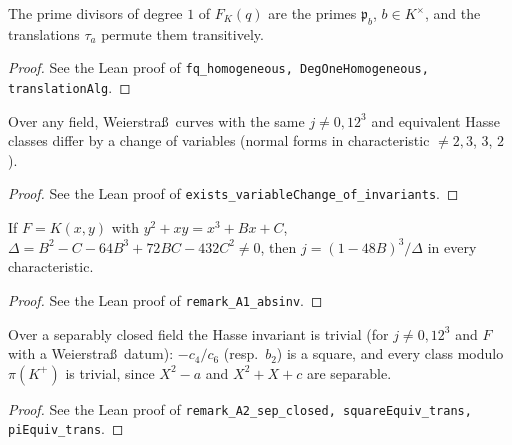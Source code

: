 \begin{lemma}
\label{lem:Fq-homogeneous}
\leanok
The prime divisors of degree $1$ of $F_K(q)$ are the primes $\mathfrak p_b$, $b\in K^\times$, and the translations $\tau_a$ permute them transitively.
\end{lemma}
\begin{proof}
\leanok
See the Lean proof of \texttt{fq\_homogeneous, DegOneHomogeneous, translationAlg}.
\end{proof}

\begin{lemma}
\label{lem:A1-classify}
\leanok
Over any field, Weierstra\ss\ curves with the same $j\neq0,12^3$ and equivalent Hasse classes differ by a change of variables (normal forms in characteristic $\ne2,3$, $3$, $2$).
\end{lemma}
\begin{proof}
\leanok
See the Lean proof of \texttt{exists\_variableChange\_of\_invariants}.
\end{proof}

\begin{remark}[Remark 1 (formula for $j$ from $y^2+xy=x^3+Bx+C$)]
\label{rem:A-1}
\leanok
If $F=K(x,y)$ with $y^2+xy=x^3+Bx+C$, $\Delta=B^2-C-64B^3+72BC-432C^2\ne0$, then $j=(1-48B)^3/\Delta$ in every characteristic.
\end{remark}
\begin{proof}
\leanok
See the Lean proof of \texttt{remark\_A1\_absinv}.
\end{proof}

\begin{remark}
\label{rem:A-2}
\leanok
Over a separably closed field the Hasse invariant is trivial (for $j\ne0,12^3$ and $F$ with a Weierstra\ss\ datum): $-c_4/c_6$ (resp.\ $b_2$) is a square, and every class modulo $\pi(K^+)$ is trivial, since $X^2-a$ and $X^2+X+c$ are separable.
\end{remark}
\begin{proof}
\leanok
See the Lean proof of \texttt{remark\_A2\_sep\_closed, squareEquiv\_trans, piEquiv\_trans}.
\end{proof}

